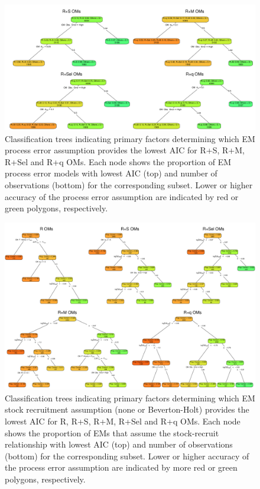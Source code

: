 \documentclass[
  12pt,
]{article}
\begin{document}
\begin{landscape}
\begin{figure}
\begin{center}
\includegraphics{AIC_PE_classification_plots}
\end{center}
\caption{Classification trees indicating primary factors determining which EM process error assumption provides the lowest AIC for R+S, R+M, R+Sel and R+q OMs. Each node shows the proportion of EM process error models with lowest AIC (top) and number of observations (bottom) for the corresponding subset. Lower or higher accuracy of the process error assumption are indicated by red or green polygons, respectively.}\label{AIC_PE_class}
\end{figure}
\end{landscape}

\begin{landscape}
\begin{figure}
\begin{center}
\includegraphics{AIC_SRR_classification_plots}
\end{center}
\caption{Classification trees indicating primary factors determining which EM stock recruitment assumption (none or Beverton-Holt) provides the lowest AIC for R, R+S, R+M, R+Sel and R+q OMs. Each node shows the proportion of EMs that assume the stock-recruit relationship with lowest AIC (top) and number of observations (bottom) for the corresponding subset. Lower or higher accuracy of the process error assumption are indicated by more red or green polygons, respectively.}\label{AIC_SRR_class}
\end{figure}
\end{landscape}
\end{document}
